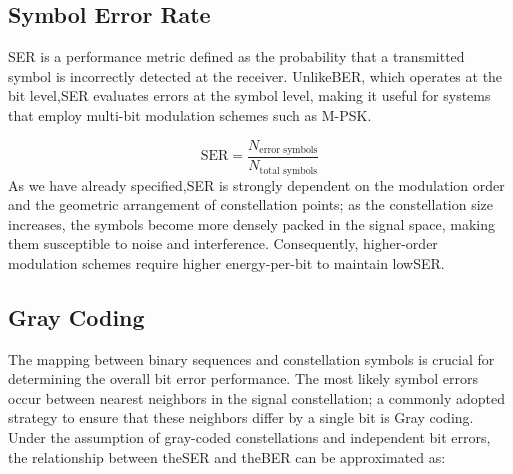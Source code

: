 \subsection{Symbol Error Rate}

\gls{SER} is a performance metric defined as the probability that a transmitted symbol is incorrectly detected at the receiver. Unlike\gls{BER}, which operates at the bit level,\gls{SER} evaluates errors at the symbol level, making it useful for systems that employ multi-bit modulation schemes such as M-\gls{PSK}.

\begin{equation}
    \label{eq:ser_definition}
    \text{SER} = \frac{N_{\text{error symbols}}}{N_{\text{total symbols}}}
\end{equation}
As we have already specified,\gls{SER} is strongly dependent on the modulation order and the geometric arrangement of constellation points; as the constellation size increases, the symbols become more densely packed in the signal space, making them susceptible to noise and interference. Consequently, higher-order modulation schemes require higher energy-per-bit to maintain low\gls{SER}.

\subsection{Gray Coding}
The mapping between binary sequences and constellation symbols is crucial for determining the overall bit error performance. The most likely symbol errors occur between nearest neighbors in the signal constellation; a commonly adopted strategy to ensure that these neighbors differ by a single bit is Gray coding.
Under the assumption of gray-coded constellations and independent bit errors, the relationship between the\gls{SER} and the\gls{BER} can be approximated as:

